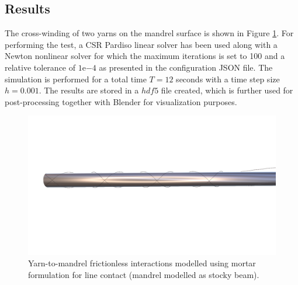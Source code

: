 \subsection{Results}
The cross-winding of two yarns on the mandrel surface is shown in Figure \ref{testsetup}. For performing the test, a CSR Pardiso linear solver has been used along with a Newton nonlinear solver for which the maximum iterations is set to 100 and a relative tolerance of $1\mathrm{e}{-4}$ as presented in the configuration JSON file. The simulation is performed for a total time $T = 12$ seconds with a time step size $h = 0.001$. The results are stored in a $hdf5$ file created, which is further used for post-processing together with Blender for visualization purposes.

\begin{figure}[h]
    \centering
    \includegraphics[width=400pt]{figures/mortaryarnmandrel_1.png}
    \caption{Yarn-to-mandrel frictionless interactions modelled using mortar formulation for line contact (mandrel modelled as stocky beam).}
    \label{testsetup}
\end{figure}

















